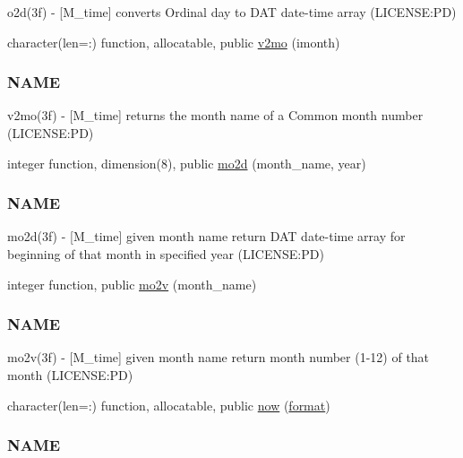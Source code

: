 \begin{DoxyCompactItemize}
\begin{DoxyCompactList}
o2d(3f) -\/ \mbox{[}M\+\_\+time\mbox{]} converts Ordinal day to D\+AT date-\/time array (L\+I\+C\+E\+N\+SE\+:PD) \end{DoxyCompactList}\item 
character(len=\+:) function, allocatable, public \mbox{\hyperlink{namespacem__time_a6f28cf00e4998bb50bb503f5e4bd3f77}{v2mo}} (imonth)
\begin{DoxyCompactList}\small\item\em \subsubsection*{N\+A\+ME}

v2mo(3f) -\/ \mbox{[}M\+\_\+time\mbox{]} returns the month name of a Common month number (L\+I\+C\+E\+N\+SE\+:PD) \end{DoxyCompactList}\item 
integer function, dimension(8), public \mbox{\hyperlink{namespacem__time_a8188c7ed4e592c4f2388d28c75486726}{mo2d}} (month\+\_\+name, year)
\begin{DoxyCompactList}\small\item\em \subsubsection*{N\+A\+ME}

mo2d(3f) -\/ \mbox{[}M\+\_\+time\mbox{]} given month name return D\+AT date-\/time array for beginning of that month in specified year (L\+I\+C\+E\+N\+SE\+:PD) \end{DoxyCompactList}\item 
integer function, public \mbox{\hyperlink{namespacem__time_ad7bf0886754757e8961e562f06cf3bb7}{mo2v}} (month\+\_\+name)
\begin{DoxyCompactList}\small\item\em \subsubsection*{N\+A\+ME}

mo2v(3f) -\/ \mbox{[}M\+\_\+time\mbox{]} given month name return month number (1-\/12) of that month (L\+I\+C\+E\+N\+SE\+:PD) \end{DoxyCompactList}\item 
character(len=\+:) function, allocatable, public \mbox{\hyperlink{namespacem__time_a6b5e87be0e510ff268c1ecfbf67a3bdb}{now}} (\mbox{\hyperlink{namespacem__time_a8d843c997d304f40fd5aed820c5a7473}{format}})
\begin{DoxyCompactList}\small\item\em \subsubsection*{N\+A\+ME}


\end{DoxyCompactList}
\end{DoxyCompactItemize}
